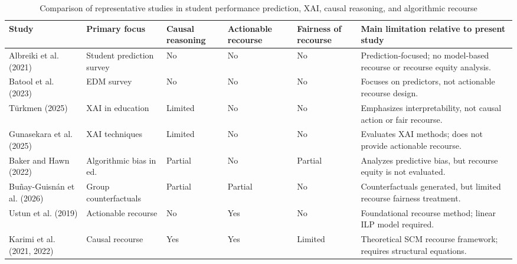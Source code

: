 \documentclass[11pt]{article}
\begin{document}
\begin{table}[H]
\centering
\caption{Comparison of representative studies in student performance prediction, XAI, causal reasoning, and algorithmic recourse}
\label{tab:related_work_comparison}
\footnotesize
\renewcommand{\arraystretch}{1.15}
\setlength{\tabcolsep}{4.5pt}
\begin{tabularx}{\textwidth}{>{\raggedright\arraybackslash}p{3.2cm} >{\raggedright\arraybackslash}p{2.2cm} >{\raggedright\arraybackslash}p{1.7cm} >{\raggedright\arraybackslash}p{1.9cm} >{\raggedright\arraybackslash}p{1.9cm} >{\raggedright\arraybackslash}X}
\toprule
\textbf{Study} & \textbf{Primary focus} & \textbf{Causal reasoning} & \textbf{Actionable recourse} & \textbf{Fairness of recourse} & \textbf{Main limitation relative to present study} \\
\midrule

Albreiki et al. (2021) \cite{Albreiki2021}
& Student prediction survey
& No
& No
& No
& Prediction-focused; no model-based recourse or recourse equity analysis. \\

Batool et al. (2023) \cite{Batool2023}
& EDM survey
& No
& No
& No
& Focuses on predictors, not actionable recourse design. \\

T\"urkmen (2025) \cite{Turkmen2025}
& XAI in education
& Limited
& No
& No
& Emphasizes interpretability, not causal action or fair recourse. \\

Gunasekara et al. (2025) \cite{Gunasekara2025}
& XAI techniques
& Limited
& No
& No
& Evaluates XAI methods; does not provide actionable recourse. \\

Baker and Hawn (2022) \cite{Baker2022}
& Algorithmic bias in ed.
& Partial
& No
& Partial
& Analyzes predictive bias, but recourse equity is not evaluated. \\

Bu\~nay-Guisn\'an et al. (2026) \cite{BunayGuisnan2026}
& Group counterfactuals
& Partial
& Partial
& No
& Counterfactuals generated, but limited recourse fairness treatment. \\

Ustun et al. (2019) \cite{Ustun2019}
& Actionable recourse
& No
& Yes
& No
& Foundational recourse method; linear ILP model required. \\

Karimi et al. (2021, 2022) \cite{Karimi2021,Karimi2022}
& Causal recourse
& Yes
& Yes
& Limited
& Theoretical SCM recourse framework; requires structural equations. \\


\end{tabularx}
\end{table}
\end{document}
